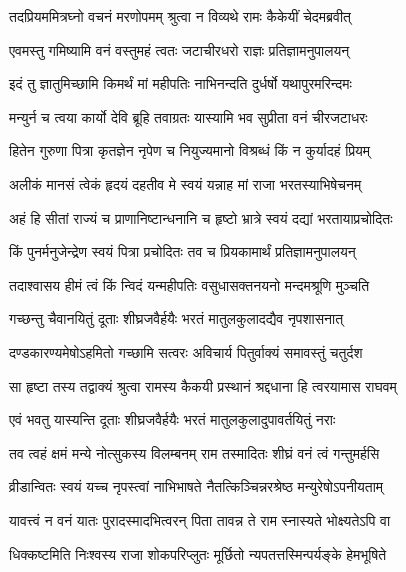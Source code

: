 \twolineshloka
{तदप्रियममित्रघ्नो वचनं मरणोपमम्}
{श्रुत्वा न विव्यथे रामः कैकेयीं चेदमब्रवीत्} %

\twolineshloka
{एवमस्तु गमिष्यामि वनं वस्तुमहं त्वतः}
{जटाचीरधरो राज्ञः प्रतिज्ञामनुपालयन्} %

\twolineshloka
{इदं तु ज्ञातुमिच्छामि किमर्थं मां महीपतिः}
{नाभिनन्दति दुर्धर्षो यथापुरमरिन्दमः} %

\twolineshloka
{मन्युर्न च त्वया कार्यो देवि ब्रूहि तवाग्रतः}
{यास्यामि भव सुप्रीता वनं चीरजटाधरः} %

\twolineshloka
{हितेन गुरुणा पित्रा कृतज्ञेन नृपेण च}
{नियुज्यमानो विश्रब्धं किं न कुर्यादहं प्रियम्} %

\twolineshloka
{अलीकं मानसं त्वेकं हृदयं दहतीव मे}
{स्वयं यन्नाह मां राजा भरतस्याभिषेचनम्} %

\twolineshloka
{अहं हि सीतां राज्यं च प्राणानिष्टान्धनानि च}
{हृष्टो भ्रात्रे स्वयं दद्यां भरतायाप्रचोदितः} %

\twolineshloka
{किं पुनर्मनुजेन्द्रेण स्वयं पित्रा प्रचोदितः}
{तव च प्रियकामार्थं प्रतिज्ञामनुपालयन्} %

\twolineshloka
{तदाश्वासय हीमं त्वं किं न्विदं यन्महीपतिः}
{वसुधासक्तनयनो मन्दमश्रूणि मुञ्चति} %

\twolineshloka
{गच्छन्तु चैवानयितुं दूताः शीघ्रजवैर्हयैः}
{भरतं मातुलकुलादद्यैव नृपशासनात्} %

\twolineshloka
{दण्डकारण्यमेषोऽहमितो गच्छामि सत्वरः}
{अविचार्य पितुर्वाक्यं समावस्तुं चतुर्दश} %

\twolineshloka
{सा हृष्टा तस्य तद्वाक्यं श्रुत्वा रामस्य कैकयी}
{प्रस्थानं श्रद्दधाना हि त्वरयामास राघवम्} %

\twolineshloka
{एवं भवतु यास्यन्ति दूताः शीघ्रजवैर्हयैः}
{भरतं मातुलकुलादुपावर्तयितुं नराः} %

\twolineshloka
{तव त्वहं क्षमं मन्ये नोत्सुकस्य विलम्बनम्}
{राम तस्मादितः शीघ्रं वनं त्वं गन्तुमर्हसि} %

\twolineshloka
{व्रीडान्वितः स्वयं यच्च नृपस्त्वां नाभिभाषते}
{नैतत्किञ्चिन्नरश्रेष्ठ मन्युरेषोऽपनीयताम्} %

\twolineshloka
{यावत्त्वं न वनं यातः पुरादस्मादभित्वरन्}
{पिता तावन्न ते राम स्नास्यते भोक्ष्यतेऽपि वा} %

\twolineshloka
{धिक्कष्टमिति निःश्वस्य राजा शोकपरिप्लुतः}
{मूर्छितो न्यपतत्तस्मिन्पर्यङ्के हेमभूषिते} %


